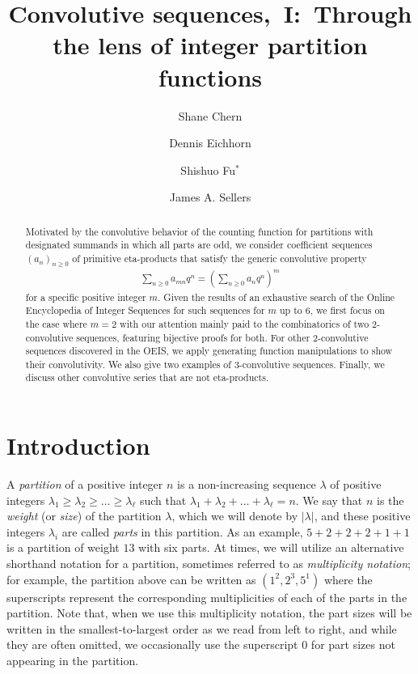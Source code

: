 \documentclass[12pt,reqno]{amsart}
\title[Convolutive sequences,~I]{Convolutive sequences,~I:~Through the lens of integer partition functions}
\author[S. Chern]{Shane Chern}
\author[D. Eichhorn]{Dennis Eichhorn}
\author[S. Fu]{Shishuo Fu$^{\ast}$}
\author[J. A. Sellers]{James A. Sellers}
\date{}
\numberwithin{equation}{section}
\theoremstyle{plain}
\theoremstyle{definition}
\theoremstyle{named}
\begin{document}
	
\sloppy

\begin{abstract}
	Motivated by the convolutive behavior of the counting function for partitions with designated summands in which all parts are odd, we consider coefficient sequences $(a_n)_{n\ge 0}$ of primitive eta-products that satisfy the generic convolutive property
	\begin{align*}
		\sum_{n\ge 0} a_{mn} q^n = \left(\sum_{n\ge 0} a_n q^n\right)^m
	\end{align*}
	for a specific positive integer $m$. Given the results of an exhaustive search of the Online Encyclopedia of Integer Sequences for such sequences for $m$ up to $6$, we first focus on the case where $m=2$ with our attention mainly paid to the combinatorics of two $2$-convolutive sequences, featuring bijective proofs for both. For other $2$-convolutive sequences discovered in the OEIS, we apply generating function manipulations to show their convolutivity. We also give two examples of $3$-convolutive sequences. Finally, we discuss other convolutive series that are not eta-products.
\end{abstract}

\maketitle

\section{Introduction}

A \emph{partition} \cite{And1998} of a positive integer $n$ is a non-increasing sequence $\lambda$ of positive integers $\lambda_1 \geq \lambda_2 \geq \dots \geq \lambda_\ell$ such that $\lambda_1 + \lambda_2 + \dots + \lambda_\ell = n$.  We say that $n$ is the \emph{weight} (or \emph{size}) of the partition $\lambda$, which we will denote by $| \lambda |$, and these positive integers $\lambda_i$ are called \emph{parts} in this partition.  As an example, $5+2+2+2+1+1$ is a partition of weight $13$ with six parts.  At times, we will utilize an alternative shorthand notation for a partition, sometimes referred to as \emph{multiplicity notation}; for example, the partition above can be written as $(1^2, 2^3, 5^1)$ where the superscripts represent the corresponding multiplicities of each of the parts in the partition.  Note that, when we use this multiplicity notation, the part sizes will be written in the smallest-to-largest order as we read from left to right, and while they are often omitted, we occasionally use the superscript $0$ for part sizes not appearing in the partition.
\end{document}
